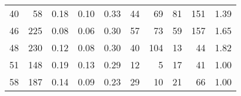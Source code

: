 \begin{tabular}{rrrrrrrrrr}
40 &       58 &                             0.18 &                             0.10 &                             0.33 &              44 &              69 &                                 81 &                             151 &       1.39 \\
46 &      225 &                             0.08 &                             0.06 &                             0.30 &              57 &              73 &                                 59 &                             157 &       1.65 \\
48 &      230 &                             0.12 &                             0.08 &                             0.30 &              40 &             104 &                                 13 &                              44 &       1.82 \\
51 &      148 &                             0.19 &                             0.13 &                             0.29 &              12 &               5 &                                 17 &                              41 &       1.00 \\
58 &      187 &                             0.14 &                             0.09 &                             0.23 &              29 &              10 &                                 21 &                              66 &       1.00 \\
\bottomrule
\end{tabular}
